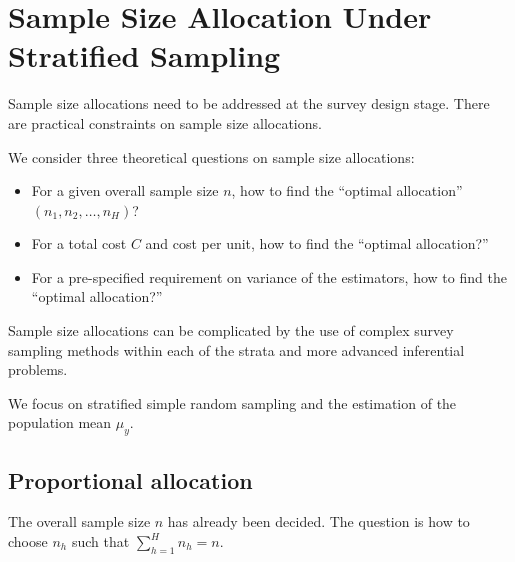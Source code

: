 \section{Sample Size Allocation Under Stratified Sampling}

Sample size allocations need to be addressed at the survey design
stage. There are practical constraints on sample size allocations.

We consider three theoretical questions on sample size allocations:

\begin{itemize}
      \item For a given overall sample size $n$, how to find the ``optimal
            allocation'' $ (n_1,n_2,\ldots,n_H) $?
      \item For a total cost $C$ and cost per unit, how to find the ``optimal
            allocation?''
      \item For a pre-specified requirement on variance of the estimators,
            how to find the ``optimal allocation?''
\end{itemize}
Sample size allocations can be complicated by the use of complex
survey sampling methods within each of the strata and more advanced
inferential problems.

We focus on stratified simple random sampling and the estimation of
the population mean $ \mu_y $.

\subsection{Proportional allocation}

The overall sample size $n$ has already been decided. The question is
how to choose $ n_h $ such that $ \sum_{h=1}^{H}n_h=n $.

